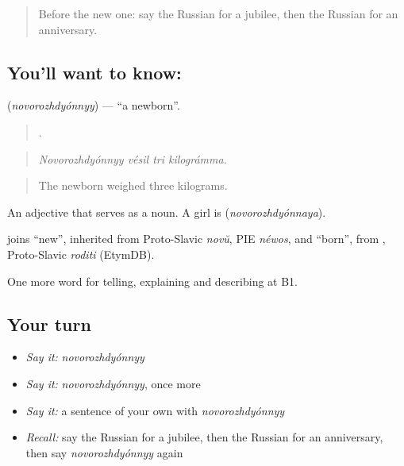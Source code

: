 \label{lesson:RU-C310-novorozhdyonnyy}



\begin{quote}
Before the new one: say the Russian for a jubilee, then the Russian for an anniversary.
\end{quote}

\subsection*{You'll want to know: }
\textbf{} (\emph{novorozhdyónnyy}) — \textquotedblleft{}a newborn\textquotedblright{}.

\begin{quote}
   .
\end{quote}

\begin{quote}
\emph{Novorozhdyónnyy vésil tri kilográmma.}
\end{quote}

\begin{quote}
The newborn weighed three kilograms.
\end{quote}

An adjective that serves as a noun. A girl is \emph{} (\emph{novorozhdyónnaya}).

\begin{cousinweb}
\emph{} joins \emph{} \textquotedblleft{}new\textquotedblright{}, inherited from Proto-Slavic \emph{novŭ}, PIE \emph{néwos}, and \emph{} \textquotedblleft{}born\textquotedblright{}, from \emph{}, Proto-Slavic \emph{roditi} (EtymDB).
\end{cousinweb}

\begin{grammarlens}[title={What you've built}]
One more word for telling, explaining and describing at B1.
\end{grammarlens}

\subsection*{Your turn}
\begin{itemize}
\raggedright
  \item \emph{Say it:} \emph{novorozhdyónnyy}
  \item \emph{Say it:} \emph{novorozhdyónnyy}, once more
  \item \emph{Say it:} a sentence of your own with \emph{novorozhdyónnyy}
  \item \emph{Recall:} say the Russian for a jubilee, then the Russian for an anniversary, then say \emph{novorozhdyónnyy} again
\end{itemize}


